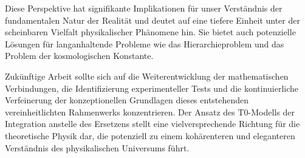 \documentclass[12pt,a4paper]{article}
\begin{document}
	Diese Perspektive hat signifikante Implikationen für unser Verständnis der fundamentalen Natur der Realität und deutet auf eine tiefere Einheit unter der scheinbaren Vielfalt physikalischer Phänomene hin. Sie bietet auch potenzielle Lösungen für langanhaltende Probleme wie das Hierarchieproblem und das Problem der kosmologischen Konstante.
	
	Zukünftige Arbeit sollte sich auf die Weiterentwicklung der mathematischen Verbindungen, die Identifizierung experimenteller Tests und die kontinuierliche Verfeinerung der konzeptionellen Grundlagen dieses entstehenden vereinheitlichten Rahmenwerks konzentrieren. Der Ansatz des T0-Modells der Integration anstelle des Ersetzens stellt eine vielversprechende Richtung für die theoretische Physik dar, die potenziell zu einem kohärenteren und eleganteren Verständnis des physikalischen Universums führt.
	
\end{document}
